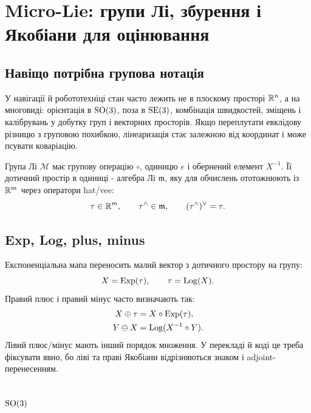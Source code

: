 \section{Micro-Lie: групи Лі, збурення і Якобіани для оцінювання}

\subsection{Навіщо потрібна групова нотація}

У навігації й робототехніці стан часто лежить не в плоскому просторі $\mathbb{R}^n$, а на многовиді: орієнтація в $\mathrm{SO}(3)$, поза в $\mathrm{SE}(3)$, комбінація швидкостей, зміщень і калібрувань у добутку груп і векторних просторів. Якщо переплутати евклідову різницю з груповою похибкою, лінеаризація стає залежною від координат і може псувати коваріацію.

Група Лі $\mathcal M$ має групову операцію $\circ$, одиницю $e$ і обернений елемент $X^{-1}$. Її дотичний простір в одиниці - алгебра Лі $\mathfrak m$, яку для обчислень ототожнюють із $\mathbb{R}^m$ через оператори hat/vee:
\begin{equation}
 \tau\in\mathbb{R}^m,\qquad \tau^\wedge\in\mathfrak m,
 \qquad (\tau^\wedge)^\vee=\tau.
\end{equation}

\subsection{Exp, Log, plus, minus}

Експоненціальна мапа переносить малий вектор з дотичного простору на групу:
\begin{equation}
 X = \mathrm{Exp}(\tau),\qquad \tau=\mathrm{Log}(X).
\end{equation}
Правий плюс і правий мінус часто визначають так:
\begin{align}
 X\oplus \tau &= X\circ\mathrm{Exp}(\tau),\\
 Y\ominus X &= \mathrm{Log}(X^{-1}\circ Y).
\end{align}
Лівий плюс/мінус мають інший порядок множення. У перекладі й коді це треба фіксувати явно, бо ліві та праві Якобіани відрізняються знаком і adjoint-перенесенням.

\subsection{$\mathrm{SO}(3)$}

